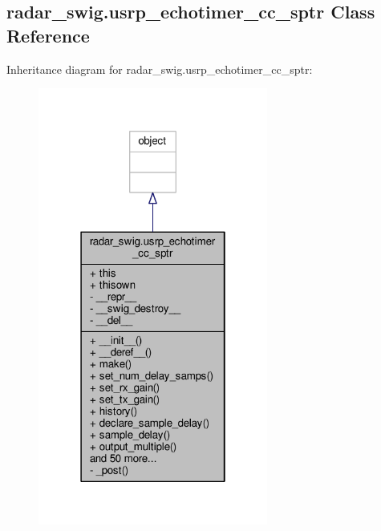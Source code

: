 \subsection{radar\+\_\+swig.\+usrp\+\_\+echotimer\+\_\+cc\+\_\+sptr Class Reference}
\label{classradar__swig_1_1usrp__echotimer__cc__sptr}


Inheritance diagram for radar\+\_\+swig.\+usrp\+\_\+echotimer\+\_\+cc\+\_\+sptr\+:
\nopagebreak
\begin{figure}[H]
\begin{center}
\leavevmode
\includegraphics[width=214pt]{d0/d31/classradar__swig_1_1usrp__echotimer__cc__sptr__inherit__graph}
\end{center}
\end{figure}


